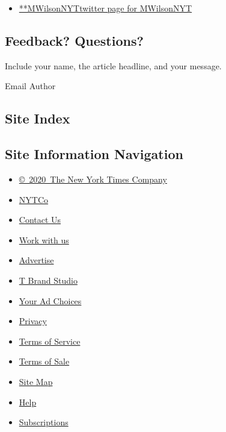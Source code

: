 \begin{itemize}
\tightlist
\item
  \href{https://twitter.com/MWilsonNYT}{**MWilsonNYTtwitter page for
  MWilsonNYT}
\end{itemize}

\hypertarget{feedback-questions}{%
\subsection{Feedback? Questions?}\label{feedback-questions}}

Include your name, the article headline, and your message.

Email Author

\hypertarget{site-index}{%
\subsection{Site Index}\label{site-index}}

\hypertarget{site-information-navigation}{%
\subsection{Site Information
Navigation}\label{site-information-navigation}}

\begin{itemize}
\tightlist
\item
  \href{https://help.nytimes3xbfgragh.onion/hc/en-us/articles/115014792127-Copyright-notice}{©~2020~The
  New York Times Company}
\end{itemize}

\begin{itemize}
\tightlist
\item
  \href{https://www.nytco.com/}{NYTCo}
\item
  \href{https://help.nytimes3xbfgragh.onion/hc/en-us/articles/115015385887-Contact-Us}{Contact
  Us}
\item
  \href{https://www.nytco.com/careers/}{Work with us}
\item
  \href{https://nytmediakit.com/}{Advertise}
\item
  \href{http://www.tbrandstudio.com/}{T Brand Studio}
\item
  \href{https://www.nytimes3xbfgragh.onion/privacy/cookie-policy\#how-do-i-manage-trackers}{Your
  Ad Choices}
\item
  \href{https://www.nytimes3xbfgragh.onion/privacy}{Privacy}
\item
  \href{https://help.nytimes3xbfgragh.onion/hc/en-us/articles/115014893428-Terms-of-service}{Terms
  of Service}
\item
  \href{https://help.nytimes3xbfgragh.onion/hc/en-us/articles/115014893968-Terms-of-sale}{Terms
  of Sale}
\item
  \href{https://spiderbites.nytimes3xbfgragh.onion}{Site Map}
\item
  \href{https://help.nytimes3xbfgragh.onion/hc/en-us}{Help}
\item
  \href{https://www.nytimes3xbfgragh.onion/subscription?campaignId=37WXW}{Subscriptions}
\end{itemize}
